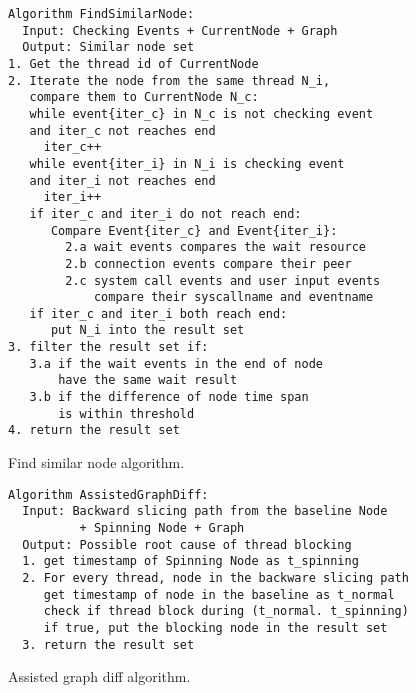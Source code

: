 \begin{figure}[H]
\footnotesize\begin{verbatim}
Algorithm FindSimilarNode:
  Input: Checking Events + CurrentNode + Graph
  Output: Similar node set
1. Get the thread id of CurrentNode
2. Iterate the node from the same thread N_i, 
   compare them to CurrentNode N_c:
   while event{iter_c} in N_c is not checking event
   and iter_c not reaches end
   	 iter_c++
   while event{iter_i} in N_i is checking event
   and iter_i not reaches end
     iter_i++
   if iter_c and iter_i do not reach end:
      Compare Event{iter_c} and Event{iter_i}:
        2.a wait events compares the wait resource
        2.b connection events compare their peer
        2.c system call events and user input events
            compare their syscallname and eventname
   if iter_c and iter_i both reach end:
      put N_i into the result set
3. filter the result set if:
   3.a if the wait events in the end of node
       have the same wait result
   3.b if the difference of node time span
       is within threshold
4. return the result set
\end{verbatim}
    \caption{\xxx Find similar node algorithm.}
    \label{fig:alg-findsimilarnode}
\end{figure}

\begin{figure}[H]
\footnotesize\begin{verbatim}
Algorithm AssistedGraphDiff:
  Input: Backward slicing path from the baseline Node
          + Spinning Node + Graph
  Output: Possible root cause of thread blocking
  1. get timestamp of Spinning Node as t_spinning
  2. For every thread, node in the backware slicing path
     get timestamp of node in the baseline as t_normal
     check if thread block during (t_normal. t_spinning)
     if true, put the blocking node in the result set
  3. return the result set
\end{verbatim}
    \caption{\xxx Assisted graph diff algorithm.}
    \label{fig:alg-graphdiff}
\end{figure}

